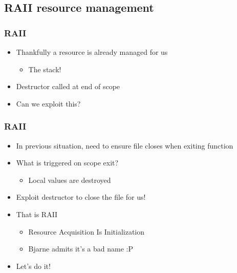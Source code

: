 


\subsection{RAII resource management}
\frame{\subsectionpage}

\begin{frame}
    \frametitle{RAII}
    \begin{itemize}
        \item<1->Thankfully a resource is already managed for us
            \begin{itemize}
                \item<2->The stack!
            \end{itemize}
        \item<2->Destructor called at end of scope
        \item<2->Can we exploit this?
    \end{itemize}
\end{frame}

\begin{frame}
    \frametitle{RAII}
    \begin{itemize}
        \item In previous situation, need to ensure file closes when exiting function
        \item What is triggered on scope exit?
            \begin{itemize}
                \item Local values are destroyed
            \end{itemize}
        \item Exploit destructor to close the file for us!
        \item That is RAII
            \begin{itemize}
                \item Resource Acquisition Is Initialization
                \item Bjarne admits it's a bad name :P
            \end{itemize}
        \item Let's do it!
    \end{itemize}
\end{frame}


